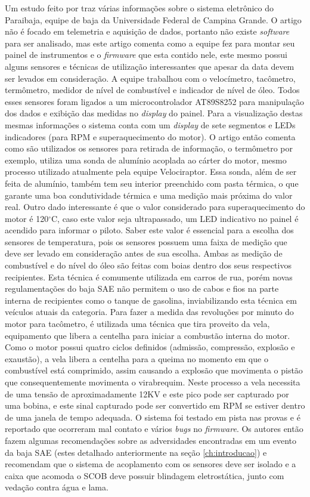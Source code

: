 Um estudo feito por  traz várias informações sobre o sistema eletrônico do Paraibaja, equipe de baja da Universidade Federal de Campina Grande. O artigo não é focado em telemetria e aquisição de dados, portanto não existe \textit{software} para ser analisado, mas este artigo comenta como a equipe fez para montar seu painel de instrumentos e o \textit{firmware} que esta contido nele, este mesmo possui alguns sensores e técnicas de utilização interessantes que apesar da data devem ser levados em consideração. A equipe trabalhou com o velocímetro, tacômetro, termômetro, medidor de nível de combustível e indicador de nível de óleo. Todos esses sensores foram ligados a um microcontrolador AT89S8252 para manipulação dos dados e exibição das medidas no \textit{display} do painel. Para a visualização destas mesmas informações o sistema conta com um \textit{display} de sete segmentos e LEDs indicadores (para RPM e superaquecimento do motor). O artigo então comenta como são utilizados os sensores para retirada de informação, o termômetro por exemplo, utiliza uma sonda de alumínio acoplada ao cárter do motor, mesmo processo utilizado atualmente pela equipe Velociraptor. Essa sonda, além de ser feita de alumínio, também tem seu interior preenchido com pasta térmica, o que garante uma boa condutividade térmica e uma medição mais próxima do valor real. Outro dado interessante é que o valor considerado para superaquecimento do motor é 120$^\circ$C, caso este valor seja ultrapassado, um LED indicativo no painel é acendido para informar o piloto. Saber este valor é essencial para a escolha dos sensores de temperatura, pois os sensores possuem uma faixa de medição que deve ser levado em consideração antes de sua escolha. Ambas as medição de combustível e do nível do óleo são feitas com boias dentro dos seus respectivos recipientes. Esta técnica é comumente utilizada em carros de rua, porém novas regulamentações do baja SAE \cite{regulamentobajasae} não permitem o uso de cabos e fios na parte interna de recipientes como o tanque de gasolina, inviabilizando esta técnica em veículos atuais da categoria. Para fazer a medida das revoluções por minuto do motor para tacômetro, é utilizada uma técnica que tira proveito da vela, equipamento que libera a centelha para iniciar a combustão interna do motor. Como o motor possui quatro ciclos definidos (admissão, compressão, explosão e exaustão), a vela libera a centelha para a queima no momento em que o combustível está comprimido, assim causando a explosão que movimenta o pistão que consequentemente movimenta o virabrequim. Neste processo a vela necessita de uma tensão de aproximadamente 12KV e este pico pode ser capturado por uma bobina, e este sinal capturado pode ser convertido em RPM se estiver dentro de uma janela de tempo adequada. O sistema foi testado em pista nas provas e é reportado que ocorreram mal contato e vários \textit{bugs} no \textit{firmware}. Os autores então fazem algumas recomendações sobre as adversidades encontradas em um evento da baja SAE (estes detalhado anteriormente na seção \ref{ch:introducao}) e recomendam que o sistema de acoplamento com os sensores deve ser isolado e a caixa que acomoda o SCOB deve possuir blindagem eletrostática, junto com vedação contra água e lama.

